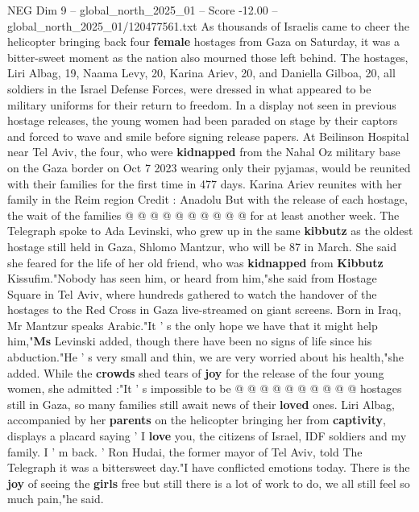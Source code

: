 \begin{textsample}{NEG Dim 9 – global\_north\_2025\_01 – Score -12.00 – global\_north\_2025\_01/120477561.txt}  \label{ex:f9_neg_021}
As thousands of Israelis came to cheer the helicopter bringing back four \textbf{female} hostages from Gaza on Saturday, it was a bitter-sweet moment as the nation also mourned those left behind.
The hostages, Liri Albag, 19, Naama Levy, 20, Karina Ariev, 20, and Daniella Gilboa, 20, all soldiers in the Israel Defense Forces, were dressed in what appeared to be military uniforms for their return to freedom.
In a display not seen in previous hostage releases, the young women had been paraded on stage by their captors and forced to wave and smile before signing release papers.
At Beilinson Hospital near Tel Aviv, the four, who were \textbf{kidnapped} from the Nahal Oz military base on the Gaza border on Oct 7 2023 wearing only their pyjamas, would be reunited with their families for the first time in 477 days.
Karina Ariev reunites with her family in the Reim region Credit : Anadolu But with the release of each hostage, the wait of the families @ @ @ @ @ @ @ @ @ @ for at least another week.
The Telegraph spoke to Ada Levinski, who grew up in the same \textbf{kibbutz} as the oldest hostage still held in Gaza, Shlomo Mantzur, who will be 87 in March.
She said she feared for the life of her old friend, who was \textbf{kidnapped} from \textbf{Kibbutz} Kissufim."Nobody has seen him, or heard from him,"she said from Hostage Square in Tel Aviv, where hundreds gathered to watch the handover of the hostages to the Red Cross in Gaza live-streamed on giant screens.
Born in Iraq, Mr Mantzur speaks Arabic."It ' s the only hope we have that it might help him,"\textbf{Ms} Levinski added, though there have been no signs of life since his abduction."He ' s very small and thin, we are very worried about his health,"she added.
While the \textbf{crowds} shed tears of \textbf{joy} for the release of the four young women, she admitted :"It ' s impossible to be @ @ @ @ @ @ @ @ @ @ hostages still in Gaza, so many families still await news of their \textbf{loved} ones.
Liri Albag, accompanied by her \textbf{parents} on the helicopter bringing her from \textbf{captivity}, displays a placard saying ' I \textbf{love} you, the citizens of Israel, IDF soldiers and my family.
I ' m back. ' Ron Hudai, the former mayor of Tel Aviv, told The Telegraph it was a bittersweet day."I have conflicted emotions today.
There is the \textbf{joy} of seeing the \textbf{girls} free but still there is a lot of work to do, we all still feel so much pain,"he said.

\end{textsample}
